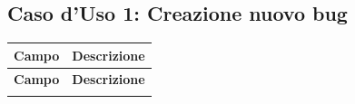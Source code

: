 
\subsection{Caso d'Uso 1: Creazione nuovo bug}

\begin{longtable}{|p{3cm}|p{7cm}|p{5.5cm}|}
\hline
\textbf{Campo} & \multicolumn{2}{p{12.5cm}|}{\textbf{Descrizione}} \\
\hline
\endfirsthead
\hline
\textbf{Campo} & \multicolumn{2}{p{12.5cm}|}{\textbf{Descrizione}} \\
\hline
\endhead
\hline
\endfoot
\hline
\endlastfoot


\end{longtable}

